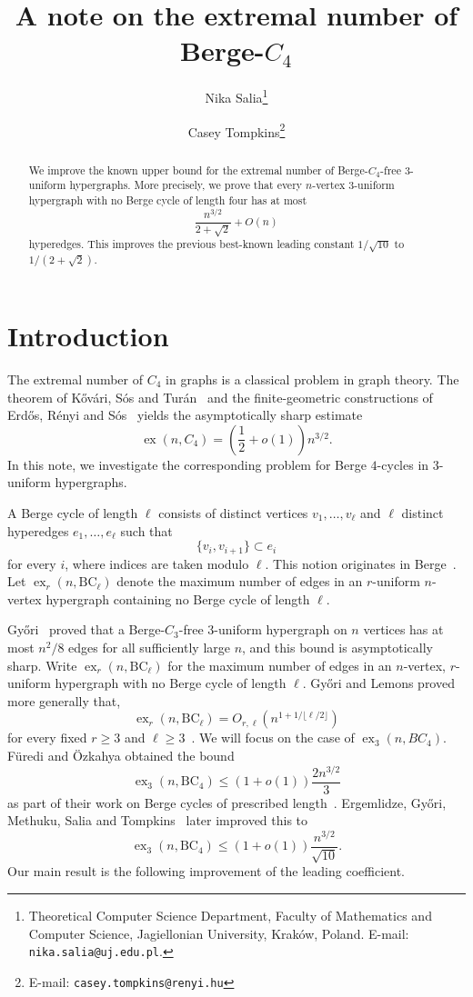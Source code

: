 \documentclass[11pt]{article}
\title{A note on the extremal number of Berge-\texorpdfstring{$C_4$}{C4}}
\author{
Nika Salia\thanks{
Theoretical Computer Science Department, Faculty of Mathematics and Computer Science, 
Jagiellonian University, Kraków, Poland. 
E-mail: \texttt{nika.salia@uj.edu.pl}.
}
\and
Casey Tompkins\thanks{
E-mail: \texttt{casey.tompkins@renyi.hu}}
}
\date{}
\newcommand{\ex}{\operatorname{ex}}
\newcommand{\BC}{\mathrm{BC}}
\begin{document}
\maketitle

\begin{abstract}
We improve the known upper bound for the extremal number of Berge-$C_4$-free $3$-uniform hypergraphs. More precisely, we prove that every $n$-vertex $3$-uniform hypergraph with no Berge cycle of length four has at most
\[
        \frac{n^{3/2}}{2+\sqrt2}+O(n)
\]
hyperedges. This improves the previous best-known leading constant $1/\sqrt{10}$ to $1/(2+\sqrt2)$.
\end{abstract}


\section{Introduction}

The extremal number of $C_4$ in graphs is a classical problem in graph theory.  The theorem of K\H{o}v\'ari, S\'os and Tur\'an~\cite{kHovari1954problem} 
and the finite-geometric constructions of Erd\H{o}s, R\'enyi and
S\'os~\cite{erdHos1966problem} yields the asymptotically sharp estimate
\[
        \ex(n,C_4)=\left(\frac12+o(1)\right)n^{3/2}.
\]
In this note, we investigate the corresponding problem for Berge $4$-cycles in $3$-uniform hypergraphs.

A Berge cycle of length $\ell$ consists of distinct vertices
$v_1,\ldots,v_\ell$ and $\ell$ distinct hyperedges $e_1,\ldots,e_\ell$ such that
\[
        \{v_i,v_{i+1}\}\subset e_i
\]
for every $i$, where indices are taken modulo $\ell$.  This notion originates in Berge~\cite{berge1985graphs}.  Let $\ex_r(n,\BC_\ell)$ denote the maximum number of edges in an $r$-uniform $n$-vertex hypergraph containing no Berge
cycle of length $\ell$. 

Gy\H{o}ri~\cite{gyHori2006triangle} proved that a Berge-$C_3$-free $3$-uniform hypergraph on
$n$ vertices has at most $n^2/8$ edges for all sufficiently large $n$, and this
bound is asymptotically sharp.  Write $\ex_r(n,\BC_\ell)$ for the maximum number of edges in an $n$-vertex, $r$-uniform hypergraph with no Berge cycle of length $\ell$. Gy\H{o}ri and Lemons proved more generally that,
\[
        \ex_r(n,\BC_\ell)=O_{r,\ell}\!\left(n^{1+1/\lfloor \ell/2\rfloor}\right)
\]
for every fixed $r\ge3$ and $\ell\ge3$~\cite{gyHori2012hypergraphs}.
We will focus on the case of $\ex_3(n,BC_4)$. F\"uredi and
\"Ozkahya obtained the bound
\[
        \ex_3(n,\BC_4)\le (1+o(1))\frac{2n^{3/2}}{3}
\]
as part of their work on Berge cycles of prescribed length~\cite{furedi20173}.  Ergemlidze, Gy\H{o}ri, Methuku, Salia and Tompkins~\cite{ergemlidze20203} later improved this to
\[
        \ex_3(n,\BC_4)\le (1+o(1))\frac{n^{3/2}}{\sqrt{10}}.
\]
Our main result is the following improvement of the leading coefficient.
\end{document}
